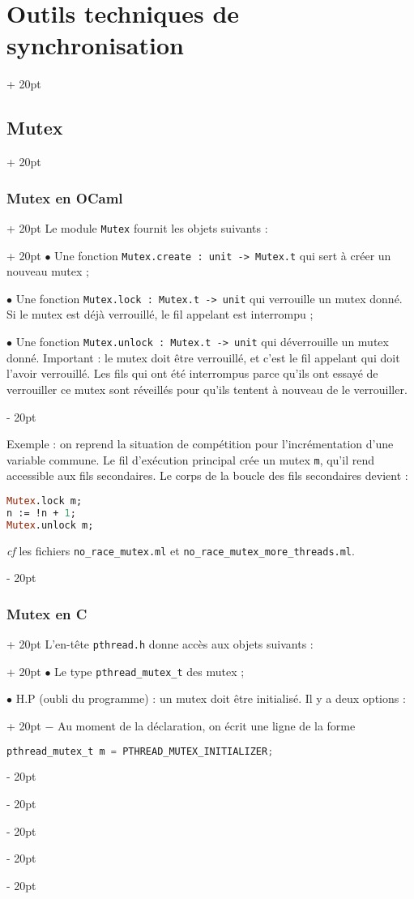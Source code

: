 \documentclass[a4paper, 12pt, twoside]{article}
\newcommand{\ind}[1][20pt]{\advance\leftskip + #1}
\newcommand{\deind}[1][20pt]{\advance\leftskip - #1}
\newenvironment{indt}[2][20pt]{#2 \par \ind[#1]}{\par \deind} %
\begin{document}
\begin{indt}{\section{Outils techniques de synchronisation}}
\begin{indt}{\subsection{Mutex}}
\begin{indt}{\subsubsection{Mutex en OCaml}}
\begin{indt}{Le module \texttt{Mutex} fournit les objets suivants :}
                    $\bullet$ Une fonction \texttt{Mutex.create : unit -> Mutex.t} qui sert à créer un nouveau mutex ;

                    $\bullet$ Une fonction \texttt{Mutex.lock : Mutex.t -> unit} qui verrouille un mutex donné.
                    Si le mutex est déjà verrouillé, le fil appelant est interrompu ;

                    $\bullet$ Une fonction \texttt{Mutex.unlock : Mutex.t -> unit} qui déverrouille un mutex donné.
                    Important : le mutex doit être verrouillé, et c'est le fil appelant qui doit l'avoir verrouillé.
                    Les fils qui ont été interrompus parce qu'ils ont essayé de verrouiller ce mutex sont réveillés pour qu'ils tentent à nouveau de le verrouiller.
                \end{indt}

                \vspace{12pt}
                
                Exemple : on reprend la situation de compétition pour l'incrémentation d'une variable commune.
                Le fil d'exécution principal crée un mutex \texttt m, qu'il rend accessible aux fils secondaires.
                Le corps de la boucle des fils secondaires devient :

                \begin{lstlisting}[language=Caml, xleftmargin=80pt]
Mutex.lock m;
n := !n + 1;
Mutex.unlock m;\end{lstlisting}

                \textit{cf} les fichiers \texttt{no\_race\_mutex.ml} et \texttt{no\_race\_mutex\_more\_threads.ml}.
            \end{indt}

            \vspace{12pt}
            
            \begin{indt}{\subsubsection{Mutex en C}}
                \begin{indt}{L'en-tête \texttt{pthread.h} donne accès aux objets suivants :}
                    $\bullet$ Le type \texttt{pthread\_mutex\_t} des mutex ;

                    \begin{indt}{$\bullet$ H.P (oubli du programme) : un mutex doit être initialisé. Il y a deux options :}
                        $-$ Au moment de la déclaration, on écrit une ligne de la forme
                        \begin{lstlisting}[language=C, xleftmargin=120pt]
pthread_mutex_t m = PTHREAD_MUTEX_INITIALIZER;\end{lstlisting}


\end{indt}
\end{indt}
\end{indt}
\end{indt}
\end{indt}
\end{document}
